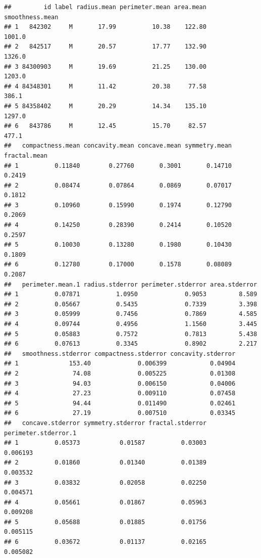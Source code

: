 \documentclass[]{article}
\begin{document}
\begin{verbatim}
##         id label radius.mean perimeter.mean area.mean smoothness.mean
## 1   842302     M       17.99          10.38    122.80          1001.0
## 2   842517     M       20.57          17.77    132.90          1326.0
## 3 84300903     M       19.69          21.25    130.00          1203.0
## 4 84348301     M       11.42          20.38     77.58           386.1
## 5 84358402     M       20.29          14.34    135.10          1297.0
## 6   843786     M       12.45          15.70     82.57           477.1
##   compactness.mean concavity.mean concave.mean symmetry.mean fractal.mean
## 1          0.11840        0.27760       0.3001       0.14710       0.2419
## 2          0.08474        0.07864       0.0869       0.07017       0.1812
## 3          0.10960        0.15990       0.1974       0.12790       0.2069
## 4          0.14250        0.28390       0.2414       0.10520       0.2597
## 5          0.10030        0.13280       0.1980       0.10430       0.1809
## 6          0.12780        0.17000       0.1578       0.08089       0.2087
##   perimeter.mean.1 radius.stderror perimeter.stderror area.stderror
## 1          0.07871          1.0950             0.9053         8.589
## 2          0.05667          0.5435             0.7339         3.398
## 3          0.05999          0.7456             0.7869         4.585
## 4          0.09744          0.4956             1.1560         3.445
## 5          0.05883          0.7572             0.7813         5.438
## 6          0.07613          0.3345             0.8902         2.217
##   smoothness.stderror compactness.stderror concavity.stderror
## 1              153.40             0.006399            0.04904
## 2               74.08             0.005225            0.01308
## 3               94.03             0.006150            0.04006
## 4               27.23             0.009110            0.07458
## 5               94.44             0.011490            0.02461
## 6               27.19             0.007510            0.03345
##   concave.stderror symmetry.stderror fractal.stderror perimeter.stderror.1
## 1          0.05373           0.01587          0.03003             0.006193
## 2          0.01860           0.01340          0.01389             0.003532
## 3          0.03832           0.02058          0.02250             0.004571
## 4          0.05661           0.01867          0.05963             0.009208
## 5          0.05688           0.01885          0.01756             0.005115
## 6          0.03672           0.01137          0.02165             0.005082

\end{verbatim}
\end{document}
